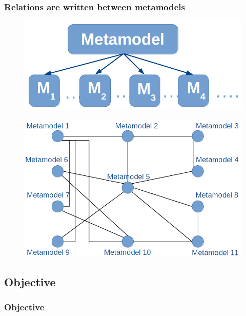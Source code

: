 \documentclass{beamer}
\begin{document}
\begin{frame}[t]
	\frametitle{Relations are written between metamodels}
	\begin{figure}
		\includegraphics[scale=0.14]{metamodels_generic}
	\end{figure}
	\pause
	\vskip -10pt
	\begin{figure}
		\includegraphics[scale=0.30]{network_metamodels_generic}
	\end{figure}
\end{frame}


\subsection{Objective}
\begin{frame}
	\frametitle{Objective}
\end{frame}
\end{document}

